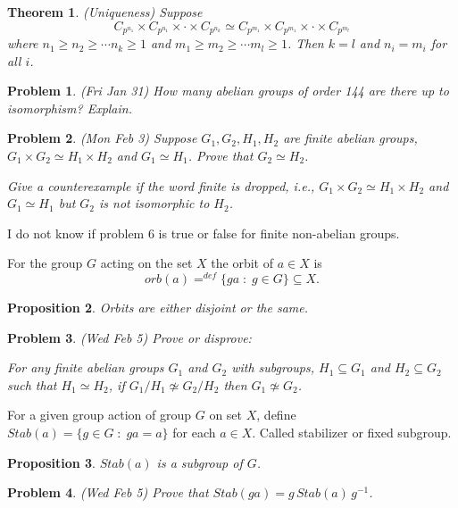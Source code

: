 \documentclass[12pt]{article}
\def\isom{\simeq}
\def\su{\subseteq}
\def\st{\;:\;}
\newtheorem{theorem}{Theorem}
\newtheorem{prop}[theorem]{Proposition}
\newtheorem{prob}{Problem}
\begin{document}

\begin{theorem}(Uniqueness)
Suppose 
$$C_{p^{n_1}}\times C_{p^{n_1}}\times\cdot\times C_{p^{n_k}}\isom
C_{p^{m_1}}\times C_{p^{m_1}}\times\cdot\times C_{p^{m_l}}$$
where $n_1\geq n_2\geq \cdots n_k\geq 1$ and 
$m_1\geq m_2\geq \cdots m_l\geq 1$.  Then $k=l$ and $n_i=m_i$ for
all $i$.
\end{theorem}

\begin{prob}(Fri Jan 31)
How many abelian groups of order 144 are there up to isomorphism?
Explain.
\end{prob}

\begin{prob}
(Mon Feb 3) Suppose $G_1,G_2,H_1,H_2$ are finite abelian groups,
$G_1\times G_2\isom H_1\times H_2$ and $G_1\isom H_1$.
Prove that $G_2\isom H_2$.
\par Give a counterexample if the word finite is dropped, i.e.,
$G_1\times G_2\isom H_1\times H_2$ and $G_1\isom H_1$ but $G_2$
is not isomorphic to $H_2$.   
\end{prob}


\noindent 
I do not know if problem 6 is true or false for finite non-abelian groups.


\bigskip
For the group $G$ acting on the set $X$
the orbit of $a\in X$ is
$$orb(a)=^{def}\{ga\st g\in G\}\su X.$$

\begin{prop} Orbits are either disjoint or the same.
\end{prop}

\begin{prob}
(Wed Feb 5) Prove or disprove:
\par For any finite abelian groups $G_1$ and $G_2$ with
subgroups, $H_1\su G_1$ and $H_2\su G_2$ such that $H_1\isom H_2$,
if $G_1/H_1\not\isom G_2/H_2$ then $G_1\not\isom G_2$.
\end{prob}

For a given group action of group $G$ on set
$X$, define $Stab(a)=\{g\in G\st ga=a\}$ for each $a\in X$.
Called stabilizer or fixed subgroup.

\begin{prop}
$Stab(a)$ is a subgroup of $G$.
\end{prop}

\begin{prob}
(Wed Feb 5) Prove that $Stab(ga)=g\,Stab(a)\,g^{-1}$.
\end{prob}
\end{document}
